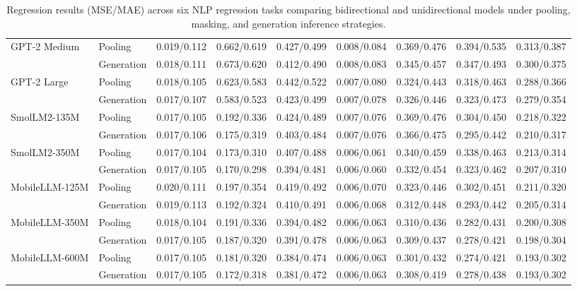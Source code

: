 \begin{table}[htbp]
{\begin{tabular}{l|l|c|c|c|c|c|c|c}
\rowcolor[HTML]{FFF5CC} GPT-2 Medium & Pooling & 0.019/0.112 & 0.662/0.619 & 0.427/0.499 & 0.008/0.084 & 0.369/0.476 & 0.394/0.535 & 0.313/0.387\\
\rowcolor[HTML]{FFF5CC}  & Generation & 0.018/0.111 & 0.673/0.620 & 0.412/0.490 & 0.008/0.083 & 0.345/0.457& 0.347/0.493 & 0.300/0.375 \\
\rowcolor[HTML]{FFF5CC} GPT-2 Large & Pooling & 0.018/0.105 & 0.623/0.583 & 0.442/0.522 & 0.007/0.080 & 0.324/0.443 & 0.318/0.463 & 0.288/0.366 \\
\rowcolor[HTML]{FFF5CC}  & Generation & 0.017/0.107 & 0.583/0.523 & 0.423/0.499 & 0.007/0.078 & 0.326/0.446 & 0.323/0.473 & 0.279/0.354 \\
\rowcolor[HTML]{FFF5CC} SmolLM2-135M & Pooling & 0.017/0.105 & 0.192/0.336 & 0.424/0.489 & 0.007/0.076 & 0.369/0.476 & 0.304/0.450 & 0.218/0.322\\
\rowcolor[HTML]{FFF5CC}  & Generation & 0.017/0.106 & 0.175/0.319 & 0.403/0.484 & 0.007/0.076 & 0.366/0.475 & 0.295/0.442 & 0.210/0.317 \\
\rowcolor[HTML]{FFF5CC} SmolLM2-350M & Pooling & 0.017/0.104 & 0.173/0.310 & 0.407/0.488 & 0.006/0.061 & 0.340/0.459 & 0.338/0.463 & 0.213/0.314\\
\rowcolor[HTML]{FFF5CC}  & Generation & 0.017/0.105 & 0.170/0.298 & 0.394/0.481 & 0.006/0.060 & 0.332/0.454 & 0.323/0.462 & 0.207/0.310\\
\rowcolor[HTML]{FFF5CC} MobileLLM-125M & Pooling & 0.020/0.111 & 0.197/0.354 & 0.419/0.492 & 0.006/0.070 & 0.323/0.446 & 0.302/0.451 & 0.211/0.320\\
\rowcolor[HTML]{FFF5CC}  & Generation & 0.019/0.113 & 0.192/0.324 & 0.410/0.491 & 0.006/0.068 & 0.312/0.448 & 0.293/0.442 & 0.205/0.314\\
\rowcolor[HTML]{FFF5CC} MobileLLM-350M & Pooling & 0.018/0.104 & 0.191/0.336 & 0.394/0.482 & 0.006/0.063& 0.310/0.436 & 0.282/0.431 & 0.200/0.308\\
\rowcolor[HTML]{FFF5CC}  & Generation & 0.017/0.105 & 0.187/0.320 & 0.391/0.478 & 0.006/0.063 & 0.309/0.437 & 0.278/0.421 & 0.198/0.304\\
\rowcolor[HTML]{FFF5CC} MobileLLM-600M & Pooling & 0.017/0.105& 0.181/0.320 & 0.384/0.474 & 0.006/0.063 & 0.301/0.432 & 0.274/0.421 & 0.193/0.302\\
\rowcolor[HTML]{FFF5CC}  & Generation & 0.017/0.105 & 0.172/0.318 & 0.381/0.472 & 0.006/0.063 & 0.308/0.419 & 0.278/0.438 & 0.193/0.302\\
\hline
\end{tabular}%
}
\caption{Regression results (MSE/MAE) across six NLP regression tasks comparing bidirectional and unidirectional models under pooling, masking, and generation inference strategies.}
\label{tab:regression_results}
\end{table}
